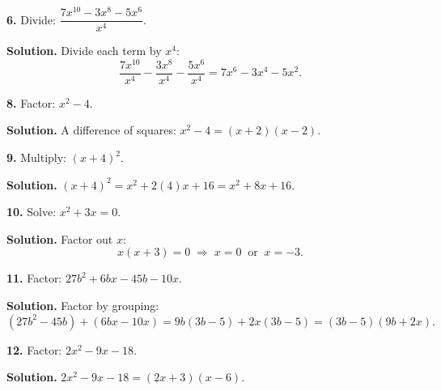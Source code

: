 \documentclass{ximera}
\begin{document}
\begin{problem}

\textbf{6.} Divide: $\dfrac{7x^{10}-3x^{8}-5x^{6}}{x^{4}}$.

\begin{hint}
\textbf{Solution.} Divide each term by $x^{4}$:
\[
  \frac{7x^{10}}{x^{4}}-\frac{3x^{8}}{x^{4}}-\frac{5x^{6}}{x^{4}}
  = 7x^{6}-3x^{4}-5x^{2}.
\]
\end{hint}
\end{problem}

\begin{problem}

\textbf{8.} Factor: $x^{2}-4$.

\begin{hint}
\textbf{Solution.} A difference of squares: $x^{2}-4=(x+2)(x-2)$.
\end{hint}
\end{problem}

\begin{problem}

\textbf{9.} Multiply: $(x+4)^{2}$.

\begin{hint}
\textbf{Solution.} $(x+4)^{2}=x^{2}+2(4)x+16=x^{2}+8x+16$.
\end{hint}
\end{problem}

\begin{problem}

\textbf{10.} Solve: $x^{2}+3x=0$.

\begin{hint}
\textbf{Solution.} Factor out $x$:
\[
  x(x+3)=0 \;\Longrightarrow\; x=0 \ \text{ or } \ x=-3 .
\]
\end{hint}
\end{problem}

\begin{problem}

\textbf{11.} Factor: $27b^{2}+6bx-45b-10x$.

\begin{hint}
\textbf{Solution.} Factor by grouping:
\[
  \left(27b^{2}-45b\right)+\left(6bx-10x\right)
  = 9b(3b-5)+2x(3b-5) = (3b-5)(9b+2x).
\]
\end{hint}
\end{problem}

\begin{problem}

\textbf{12.} Factor: $2x^{2}-9x-18$.

\begin{hint}
\textbf{Solution.} $2x^{2}-9x-18=(2x+3)(x-6)$.
\end{hint}
\end{problem}
\end{document}
